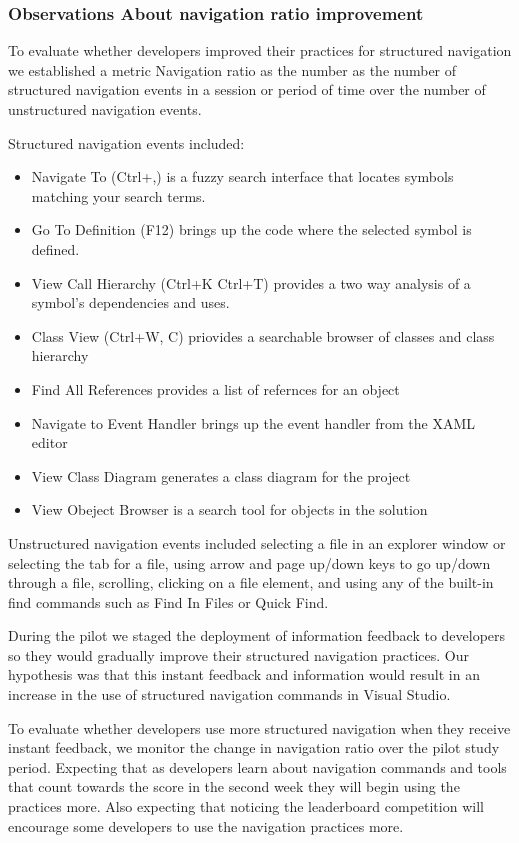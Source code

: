 \documentclass{sig-alternate}
\begin{document}
\subsubsection{Observations About navigation ratio improvement}

To evaluate whether developers improved their practices for structured navigation we established a metric Navigation ratio as the number as the number of structured navigation events in a session or period of time over the number of unstructured navigation events.  

Structured navigation events included: 
\begin{itemize}
\item Navigate To (Ctrl+,) is a fuzzy search interface that locates symbols matching your search terms.
\item Go To Definition (F12) brings up the code where the selected symbol is defined. 
\item View Call Hierarchy (Ctrl+K Ctrl+T) provides a two way analysis of a symbol's dependencies and uses. 
\item Class View (Ctrl+W, C) priovides a searchable browser of classes and class hierarchy
\item Find All References provides a list of refernces for an object
\item Navigate to Event Handler brings up the event handler from the XAML editor
\item View Class Diagram generates a class diagram for the project
\item View Obeject Browser is a search tool for objects in the solution
\end{itemize}

Unstructured navigation events included selecting a file in an explorer window or selecting the tab for a file, using arrow and page up/down keys to go up/down through a file, scrolling, clicking on a file element, and using any of the built-in find commands such as Find In Files or Quick Find.

During the pilot we staged the deployment of information feedback to developers so they would gradually improve their structured navigation practices.  Our hypothesis was that this instant feedback and information would result in an increase in the use of structured navigation commands in Visual Studio.

To evaluate whether developers use more structured navigation when they receive instant feedback, we monitor the change in navigation ratio over the pilot study period.   Expecting that as developers learn about navigation commands and tools that count towards the score in the second week they will begin using the practices more.  Also expecting that noticing the leaderboard competition will encourage some developers to use the navigation practices more.  
\end{document}
